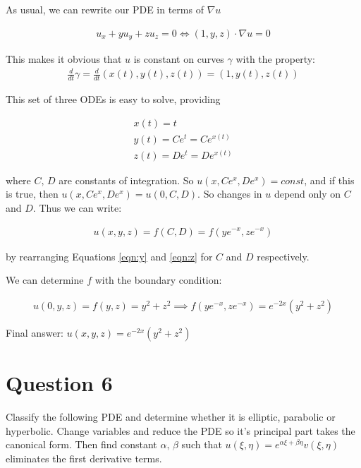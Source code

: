 \documentclass[a4paper,12pt]{article}
\begin{document}
As usual, we can rewrite our PDE in terms of $\nabla u$

\begin{eqnarray}
u_x + yu_y + zu_z = 0 \Longleftrightarrow (1,y,z)\cdot\nabla u = 0\nonumber
\end{eqnarray}

This makes it obvious that $u$ is constant on curves $\gamma$ with the property: 
\begin{eqnarray}
\frac{d}{dt}\gamma = \frac{d}{dt}(x(t),y(t),z(t)) = (1,y(t),z(t))\nonumber
\end{eqnarray}

This set of three ODEs is easy to solve, providing 

\begin{eqnarray}
\label{eqn:x}
x(t) = t\\
\label{eqn:y}
y(t) = Ce^t = Ce^{x(t)}\\
\label{eqn:z}
z(t) = De^t = De^{x(t)}
\end{eqnarray}

where $C,\,D$ are constants of integration. So $u(x,Ce^x,De^x) = const$, and if this is true, then $u(x,Ce^x,De^x) = u(0,C,D)$. So changes in $u$ depend only on $C$ and $D$. Thus we can write:

\begin{eqnarray}
u(x,y,z) = f(C,D) = f(ye^{-x},ze^{-x})\nonumber
\end{eqnarray}

by rearranging Equations \ref{eqn:y} and \ref{eqn:z} for $C$ and $D$ respectively.

We can determine $f$ with the boundary condition:

\begin{eqnarray}
u(0,y,z) = f(y,z) = y^2+z^2\implies f(ye^{-x},ze^{-x}) = e^{-2x}(y^2 + z^2)\nonumber
\end{eqnarray}

Final answer: $\boxed{u(x,y,z) = e^{-2x}(y^2 + z^2)}$

\section{Question 6}

Classify the following PDE and determine whether it is elliptic, parabolic or hyperbolic. Change variables and reduce the PDE so it's principal part takes the canonical form. Then find constant $\alpha,\,\beta$ such that $u(\xi,\eta) = e^{\alpha\xi + \beta\eta}v(\xi,\eta)$ eliminates the first derivative terms.
\end{document}
